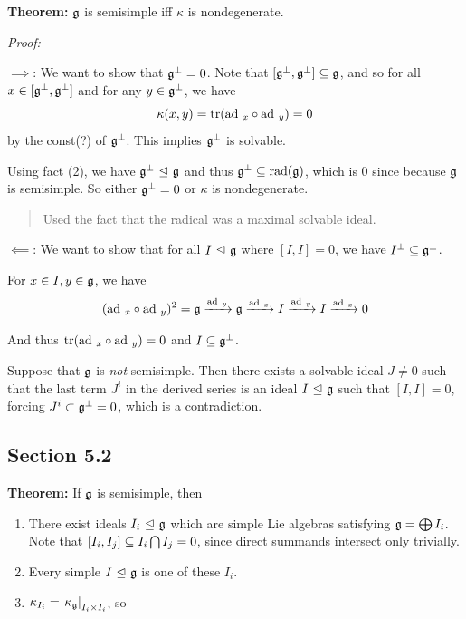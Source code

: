 \textbf{Theorem:} \({\mathfrak{g}}\) is semisimple iff \(\kappa\) is
nondegenerate.

\emph{Proof:}

\(\implies\): We want to show that \({\mathfrak{g}}^\perp = 0\). Note that
\([{\mathfrak{g}}^\perp, {\mathfrak{g}}^\perp] \subseteq {\mathfrak{g}}\), and so for all
\(x\in [{\mathfrak{g}}^\perp, {\mathfrak{g}}^\perp]\) and for any \(y\in {\mathfrak{g}}^\perp\), we
have \[
\kappa(x, y) = \mathrm{tr}(\mathrm{ad}~_x \circ \mathrm{ad}~_y) = 0
\] by the const(?) of \({\mathfrak{g}}^\perp\). This implies \({\mathfrak{g}}^\perp\) is
solvable.

Using fact (2), we have \({\mathfrak{g}}^\perp {~\trianglelefteq~} {\mathfrak{g}}\) and thus
\({\mathfrak{g}}^\perp \subseteq \mathrm{rad}({\mathfrak{g}})\), which is 0 since because
\({\mathfrak{g}}\) is semisimple. So either \({\mathfrak{g}}^\perp = 0\) or \(\kappa\) is
nondegenerate.

\begin{quote}
Used the fact that the radical was a maximal solvable ideal.
\end{quote}

\(\impliedby\): We want to show that for all \(I {~\trianglelefteq~} {\mathfrak{g}}\) where
\([I, I] = 0\), we have \(I^\perp \subseteq {\mathfrak{g}}^\perp\).

For \(x\in I, y\in {\mathfrak{g}}\), we have \[
(\mathrm{ad}~_x \circ \mathrm{ad}~_y)^2 = {\mathfrak{g}} \xrightarrow{\mathrm{ad}~_y} {\mathfrak{g}} \xrightarrow{\mathrm{ad}~_x} I \xrightarrow{\mathrm{ad}~_y} I \xrightarrow{\mathrm{ad}~_x} 0
\]

And thus \(\mathrm{tr}(\mathrm{ad}~_x \circ \mathrm{ad}~_y) = 0\) and
\(I \subseteq {\mathfrak{g}}^\perp\).

Suppose that \({\mathfrak{g}}\) is \emph{not} semisimple. Then there exists a
solvable ideal \(J \neq 0\) such that the last term \(J^i\) in the
derived series is an ideal \(I {~\trianglelefteq~} {\mathfrak{g}}\) such that \([I, I] = 0\),
forcing \(J^i \subset {\mathfrak{g}}^\perp = 0\), which is a contradiction.

\hypertarget{section-5.2}{%
\subsection{Section 5.2}\label{section-5.2}}

\textbf{Theorem:} If \({\mathfrak{g}}\) is semisimple, then

\begin{enumerate}
\def\labelenumi{\alph{enumi}.}
\item
  There exist ideals \(I_i {~\trianglelefteq~} {\mathfrak{g}}\) which are simple Lie algebras
  satisfying \({\mathfrak{g}} = \bigoplus I_i\). Note that
  \([I_i, I_j] \subseteq I_i \bigcap I_j = 0\), since direct summands
  intersect only trivially.
\item
  Every simple \(I {~\trianglelefteq~} {\mathfrak{g}}\) is one of these \(I_i\).
\item
  \(\kappa_{I_i} = {\left.{\kappa_{{\mathfrak{g}}}}\right|_{I_i \times I_i}}\), so
\end{enumerate}

